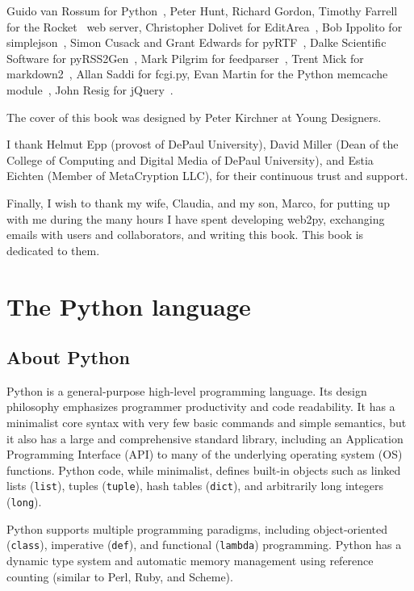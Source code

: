 \documentclass[justified,sixbynine,notoc]{tufte-book}
\def\ft{\small\tt}
\def\inxx#1{\index{#1}}
\begin{document}
\begin{fullwidth}
Guido van Rossum for Python~\cite{python}, Peter Hunt, Richard Gordon, Timothy Farrell for the Rocket~\cite{rocket}  web server, Christopher Dolivet for EditArea~\cite{editarea}, Bob Ippolito for simplejson~\cite{simplejson}, Simon Cusack and Grant Edwards for pyRTF~\cite{pyrtf}, Dalke Scientific Software for pyRSS2Gen~\cite{pyrss2gen}, Mark Pilgrim for feedparser~\cite{feedparser}, Trent Mick for markdown2~\cite{markdown2}, Allan Saddi for fcgi.py, Evan Martin for the Python memcache module~\cite{memcache}, John Resig for jQuery~\cite{jquery}.

The cover of this book was designed by Peter Kirchner at Young Designers.

I thank Helmut Epp (provost of DePaul University), David Miller (Dean of the College of Computing and Digital Media of DePaul University), and Estia Eichten (Member of MetaCryption LLC), for their continuous trust and support.

Finally, I wish to thank my wife, Claudia, and my son, Marco, for putting up with me during the many hours I have spent developing web2py, exchanging emails with users and collaborators, and writing this book. This book is dedicated to them.

\goodbreak\chapter{The Python language}

\inxx{Python}

\goodbreak\section{About Python}

Python is a general-purpose high-level programming language.
Its design philosophy emphasizes programmer productivity and code readability. It has a minimalist core syntax with very few basic commands and simple semantics, but it also has a large and comprehensive standard library, including an Application Programming Interface (API) \inxx{API} to many of the underlying operating system (OS) functions. Python code, while minimalist, defines built-in objects such as linked lists ({\ft list}), tuples ({\ft tuple}), hash tables ({\ft dict}), and arbitrarily long integers ({\ft long}).

Python supports multiple programming paradigms, including object-oriented ({\ft class}), imperative ({\ft def}), and functional ({\ft lambda}) programming. Python has a dynamic type system and automatic memory management using reference counting (similar to Perl, Ruby, and Scheme).


\end{fullwidth}
\end{document}
